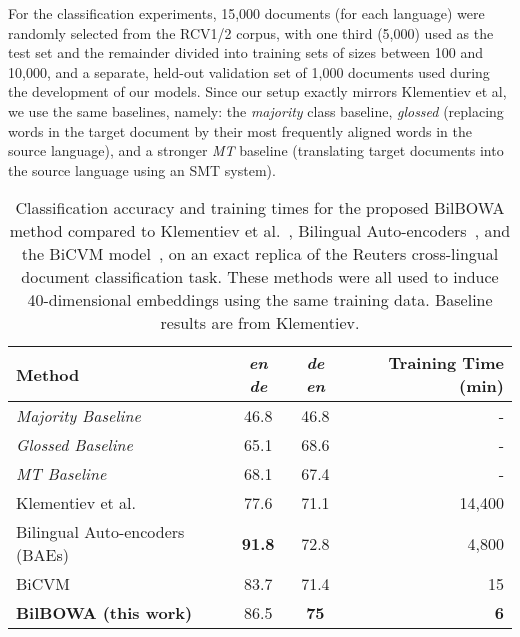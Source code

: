 \documentclass[10pt]{article}
\newcommand\bld[1]{\textbf{#1}}
\begin{document}
For the classification experiments, 15,000 documents (for each language) were
randomly selected from the RCV1/2 corpus, with one third (5,000) used as the
test set and the remainder divided into training sets of
sizes between 100 and 10,000, and a separate, held-out validation set
of 1,000 documents used during the development of our models.
Since our setup exactly mirrors Klementiev et al, we use the same baselines,
namely: the \emph{majority} class baseline, \emph{glossed} (replacing words in
the target document by their most frequently aligned words in the source
language), and a stronger \emph{MT} baseline (translating target documents into
the source language using an SMT system).

\begin{table*}
  \small
    \centering
    \begin{tabular}{l|cc|r}
      \hline
      \bld{Method}  & \emph{en}  \emph{de} & \emph{de}  \emph{en}  & \bld{Training Time (min)} \\
      \hline
      \emph{Majority Baseline} & 46.8 & 46.8 & - \\
      \emph{Glossed Baseline} & 65.1 & 68.6 & - \\
      \emph{MT Baseline} & 68.1 & 67.4 & - \\
      \hline
      Klementiev et al.\              & 77.6       & 71.1     & 14,400 \\
      Bilingual Auto-encoders (BAEs)  & \bld{91.8} & 72.8     & 4,800  \\
      BiCVM                           & 83.7       & 71.4     & 15     \\
      \bld{BilBOWA (this work)}             & 86.5       & \bld{75} & \bld{6}          \\
      \hline
    \end{tabular}
    \caption{Classification accuracy and training times for the proposed BilBOWA method compared
    to Klementiev et al.~\cite{klementiev2012}, Bilingual Auto-encoders~\cite{chandar2014autoencoder},
    and the BiCVM model~\cite{hermann2013multilingual}, on an exact replica of the
    Reuters cross-lingual document classification task. These methods were all used
    to induce 40-dimensional embeddings using the same training data. Baseline results 
    are from Klementiev.}
    \label{tab:cldc-results}
\end{table*}
\end{document}
